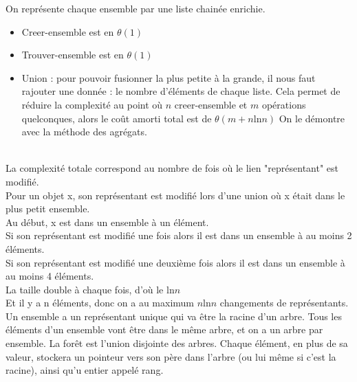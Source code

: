  On représente chaque ensemble par une liste chainée enrichie. 
\begin{itemize}
	\item Creer-ensemble est en $\theta(1)$
	\item Trouver-ensemble est en $\theta(1)$
	\item Union : pour pouvoir fusionner la plus petite à la grande, il nous faut rajouter une donnée : le nombre d'éléments de chaque liste. Cela permet de réduire la complexité au point où $n$ creer-ensemble et $m$ opérations quelconques, alors le coût amorti total est de $\theta(m+n\mathrm{ln}n)$ On le démontre avec la méthode des agrégats. 
\end{itemize}

 \\
La complexité totale correspond au nombre de fois où le lien "représentant" est modifié. \\
Pour un objet x, son représentant est modifié lors d'une union où x était dans le plus petit ensemble. \\
Au début, x est dans un ensemble à un élément. \\
Si son représentant est modifié une fois alors il est dans un ensemble à au moins 2 éléments.\\
Si son représentant est modifié une deuxième fois alors il est dans un ensemble à au moins 4 éléments.\\
La taille double à chaque fois, d'où le $\mathrm{ln}n$ \\
Et il y a n éléments, donc on a au maximum $n\mathrm{ln}n$ changements de représentants.\\

 Un ensemble a un représentant unique qui va être la racine d'un arbre. Tous les éléments d'un ensemble vont être dans le même arbre, et on a un arbre par ensemble. La forêt est l'union disjointe des arbres. Chaque élément, en plus de sa valeur, stockera un pointeur vers son père dans l'arbre (ou lui même si c'est la racine), ainsi qu'u entier appelé rang. \\

